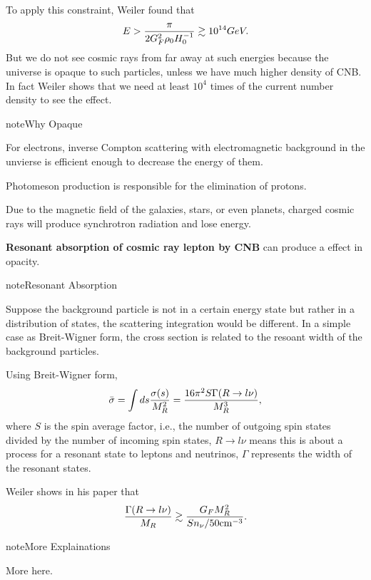 \documentclass[letterpaper,12pt,english]{sphinxmanual}
\begin{document}
To apply this constraint, Weiler found that
\begin{gather}
\begin{split}E > \frac{\pi}{2 G_F^2 \rho_0 H_0^{-1}} \gtrsim 10^{14} GeV.\end{split}\notag
\end{gather}
But we do not see cosmic rays from far away at such energies because the universe is opaque to such particles, unless we have much higher density of CNB. In fact Weiler shows that we need at least \(10^4\) times of the current number density to see the effect.

\begin{notice}{note}{Why Opaque}

For electrons, inverse Compton scattering with electromagnetic background in the unvierse is efficient enough to decrease the energy of them. \footnotemark[6]

Photomeson production is responsible for the elimination of protons.

Due to the magnetic field of the galaxies, stars, or even planets, charged cosmic rays will produce synchrotron radiation and lose energy.
\end{notice}

\textbf{Resonant absorption of cosmic ray lepton by CNB} can produce a effect in opacity. \footnotemark[6]

\begin{notice}{note}{Resonant Absorption}

Suppose the background particle is not in a certain energy state but rather in a distribution of states, the scattering integration would be different. In a simple case as Breit-Wigner form, the cross section is related to the resoant width of the background particles.
\end{notice}

Using Breit-Wigner form, \footnotemark[6]
\begin{gather}
\begin{split}\bar\sigma = \int ds \frac{\sigma(s)}{M_R^2} = \frac{16\pi^2 S \Gamma(R\to l\nu)}{M_R^3},\end{split}\notag
\end{gather}
where \(S\) is the spin average factor, i.e., the number of outgoing spin states divided by the number of incoming spin states, \(R\to l\nu\) means this is about a process for a resonant state to leptons and neutrinos, \(\Gamma\) represents the width of the resonant states.

Weiler shows in his paper that
\begin{gather}
\begin{split}\frac{\Gamma(R\to l\nu)}{ M_R } \gtrsim \frac{ G_F M_R^2 }{ S n_\nu/ 50 \mathrm{cm}^{-3} }.\end{split}\notag
\end{gather}
\begin{notice}{note}{More Explainations}

More here.
\end{notice}
\end{document}
